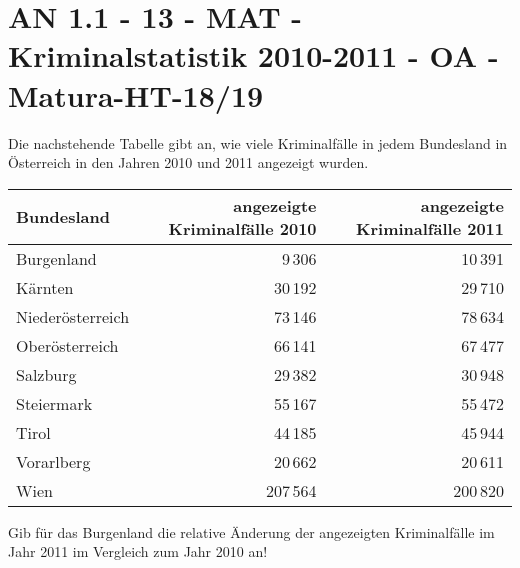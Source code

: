 \section{AN 1.1 - 13 - MAT - Kriminalstatistik 2010-2011 - OA - Matura-HT-18/19}

\begin{beispiel}[AN 1.1]{1}
Die nachstehende Tabelle gibt an, wie viele Kriminalfälle in jedem Bundesland in Österreich in den Jahren 2010 und 2011 angezeigt wurden.

\begin{tabular}{|l|r|r|}\hline
\cellcolor[gray]{0.9}Bundesland&\cellcolor[gray]{0.9}angezeigte Kriminalfälle 2010&\cellcolor[gray]{0.9}angezeigte Kriminalfälle 2011\\ \hline
Burgenland&9\,306&10\,391\\ \hline
Kärnten&30\,192&29\,710\\ \hline
Niederösterreich&73\,146&78\,634\\ \hline
Oberösterreich&66\,141&67\,477\\ \hline
Salzburg&29\,382&30\,948\\ \hline
Steiermark&55\,167&55\,472\\ \hline
Tirol&44\,185&45\,944\\ \hline
Vorarlberg&20\,662&20\,611\\ \hline
Wien&207\,564&200\,820\\ \hline
\end{tabular}

Gib für das Burgenland die relative Änderung der angezeigten Kriminalfälle im Jahr 2011 im Vergleich zum Jahr 2010 an!\leer

\end{beispiel}